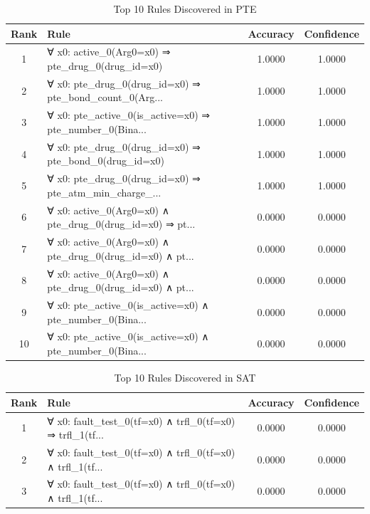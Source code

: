\documentclass[11pt,a4paper]{article}
\begin{document}
\begin{table}[h!]
\centering
\small
\caption{Top 10 Rules Discovered in PTE}
\label{tab:rules_PTE}
\begin{tabular}{|c|p{5cm}|c|c|}
\hline
\textbf{Rank} & \textbf{Rule} & \textbf{Accuracy} & \textbf{Confidence} \\
\hline
1 & ∀ x0: active\_0(Arg0=x0) ⇒ pte\_drug\_0(drug\_id=x0) & 1.0000 & 1.0000 \\
2 & ∀ x0: pte\_drug\_0(drug\_id=x0) ⇒ pte\_bond\_count\_0(Arg... & 1.0000 & 1.0000 \\
3 & ∀ x0: pte\_active\_0(is\_active=x0) ⇒ pte\_number\_0(Bina... & 1.0000 & 1.0000 \\
4 & ∀ x0: pte\_drug\_0(drug\_id=x0) ⇒ pte\_bond\_0(drug\_id=x0) & 1.0000 & 1.0000 \\
5 & ∀ x0: pte\_drug\_0(drug\_id=x0) ⇒ pte\_atm\_min\_charge\_... & 1.0000 & 1.0000 \\
6 & ∀ x0: active\_0(Arg0=x0) ∧ pte\_drug\_0(drug\_id=x0) ⇒ pt... & 0.0000 & 0.0000 \\
7 & ∀ x0: active\_0(Arg0=x0) ∧ pte\_drug\_0(drug\_id=x0) ∧ pt... & 0.0000 & 0.0000 \\
8 & ∀ x0: active\_0(Arg0=x0) ∧ pte\_drug\_0(drug\_id=x0) ∧ pt... & 0.0000 & 0.0000 \\
9 & ∀ x0: pte\_active\_0(is\_active=x0) ∧ pte\_number\_0(Bina... & 0.0000 & 0.0000 \\
10 & ∀ x0: pte\_active\_0(is\_active=x0) ∧ pte\_number\_0(Bina... & 0.0000 & 0.0000 \\
\hline
\end{tabular}
\end{table}

\begin{table}[h!]
\centering
\small
\caption{Top 10 Rules Discovered in SAT}
\label{tab:rules_SAT}
\begin{tabular}{|c|p{5cm}|c|c|}
\hline
\textbf{Rank} & \textbf{Rule} & \textbf{Accuracy} & \textbf{Confidence} \\
\hline
1 & ∀ x0: fault\_test\_0(tf=x0) ∧ trfl\_0(tf=x0) ⇒ trfl\_1(tf... & 0.0000 & 0.0000 \\
2 & ∀ x0: fault\_test\_0(tf=x0) ∧ trfl\_0(tf=x0) ∧ trfl\_1(tf... & 0.0000 & 0.0000 \\
3 & ∀ x0: fault\_test\_0(tf=x0) ∧ trfl\_0(tf=x0) ∧ trfl\_1(tf... & 0.0000 & 0.0000 \\
\hline
\end{tabular}
\end{table}
\end{document}
